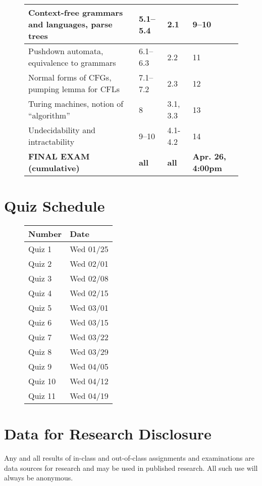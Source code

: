 \documentclass[11pt]{article}
\newenvironment{leftcell}
{
  \begin{minipage}{5cm}
}{
\end{minipage}
}
\begin{document}
\begin{figure}[H]
\begin{tabular}{llll}
        \midrule
        \begin{leftcell}
          Context-free grammars and languages, parse trees
        \end{leftcell}
        &  5.1--5.4 &
        2.1 & 9--10 \\
        \midrule
        \begin{leftcell}
          Pushdown automata, equivalence to grammars
        \end{leftcell}
        & 6.1--6.3 & 2.2 & 11 \\
        \midrule
        \begin{leftcell}
          Normal forms of CFGs, pumping lemma for CFLs
        \end{leftcell}
        & 7.1--7.2 & 2.3 & 12
        \\
        \midrule
        \begin{leftcell}
          Turing machines, notion of ``algorithm''
        \end{leftcell}
        & 8 & 3.1, 3.3 & 13 \\
        \midrule
        Undecidability and intractability & 9--10 & 4.1-4.2 & 14 \\
        \midrule
        \textbf{FINAL EXAM (cumulative)} &  \textbf{all}  & \textbf{all} &  \textbf{Apr. 26, 4:00pm} \\
        \bottomrule
    \end{tabular}
  \end{figure}

\section{Quiz Schedule}
\begin{figure}[H]
  \centering
  \begin{tabular}{ll}
    \toprule
    Number & Date \\
    \midrule
    Quiz 1  & Wed 01/25  \\
    Quiz 2  & Wed 02/01 \\
    Quiz 3  & Wed 02/08 \\
    Quiz 4  & Wed 02/15 \\
    Quiz 5  & Wed 03/01 \\
    Quiz 6  & Wed 03/15 \\
    Quiz 7  & Wed 03/22 \\
    Quiz 8  & Wed 03/29 \\
    Quiz 9  & Wed 04/05 \\
    Quiz 10 & Wed 04/12 \\
    Quiz 11 & Wed 04/19 \\
    \bottomrule
  \end{tabular}
\end{figure}

\section{Data for Research Disclosure}
Any and all results of in-class and out-of-class assignments and examinations are data sources for research and may be used in published research. All such use will always be anonymous.
\end{document}
